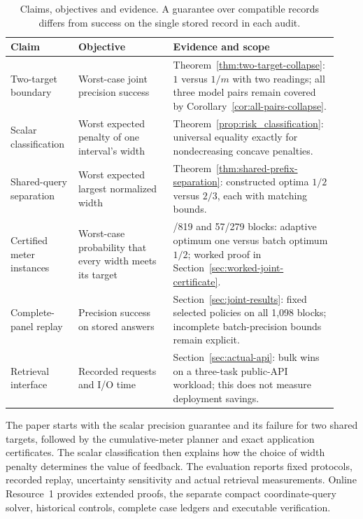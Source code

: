 \documentclass[12pt]{article}
\begin{document}
\begin{table}[htbp]\centering\small
\caption{Claims, objectives and evidence. A guarantee over compatible
records differs from success on the single stored record in each audit.}
\label{tab:claim-evidence}
\begin{tabular}{@{}>{\raggedright\arraybackslash}p{0.20\linewidth}>{\raggedright\arraybackslash}p{0.29\linewidth}>{\raggedright\arraybackslash}p{0.44\linewidth}@{}}
\toprule
Claim & Objective & Evidence and scope\\\midrule
Two-target boundary & Worst-case joint precision success &
Theorem~\ref{thm:two-target-collapse}: $1$ versus $1/m$ with two readings;
all three model pairs remain covered by Corollary~\ref{cor:all-pairs-collapse}.\\
Scalar classification & Worst expected penalty of one interval's width &
Theorem~\ref{prop:risk_classification}: universal equality exactly for
nondecreasing concave penalties.\\
Shared-query separation & Worst expected largest normalized width &
Theorem~\ref{thm:shared-prefix-separation}: constructed optima $1/2$ versus
$2/3$, each with matching bounds.\\
Certified meter instances & Worst-case probability that every width meets
its target & 165/819 and 57/279 blocks: adaptive optimum one versus batch
optimum $1/2$; worked proof in Section~\ref{sec:worked-joint-certificate}.\\
Complete-panel replay & Precision success on stored answers &
Section~\ref{sec:joint-results}: fixed selected policies on all 1,098
blocks; incomplete batch-precision bounds remain explicit.\\
Retrieval interface & Recorded requests and I/O time &
Section~\ref{sec:actual-api}: bulk wins on a three-task public-API workload;
this does not measure deployment savings.\\\bottomrule
\end{tabular}\end{table}

The paper starts with the scalar precision guarantee and its failure for
two shared targets, followed by the cumulative-meter planner and exact
application certificates. The scalar classification then explains how the
choice of width penalty determines the value of feedback. The
evaluation reports fixed protocols, recorded replay, uncertainty sensitivity
and actual retrieval measurements. Online Resource~1 provides extended
proofs, the separate compact coordinate-query solver, historical controls,
complete case ledgers and executable verification.
\end{document}
